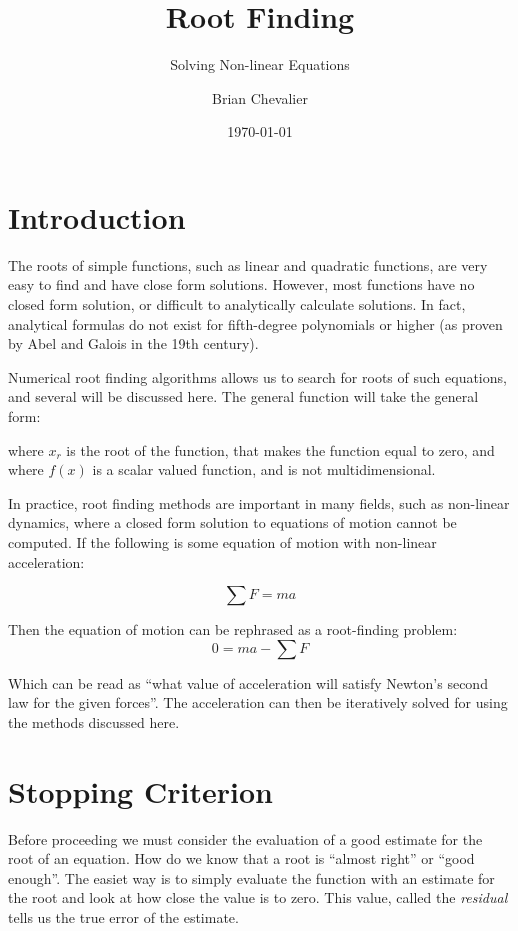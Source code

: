\documentclass{../../KDHnotes}
\title{Root Finding}
\subtitle{Solving Non-linear Equations}
\author{Brian Chevalier}
\date{\today}
\begin{document}
\maketitle
\section{Introduction}

The roots of simple functions, such as linear and quadratic functions, are very easy to find and have close form solutions. However, most functions have no closed form solution, or difficult to analytically calculate solutions. In fact, analytical formulas do not exist for fifth-degree polynomials or higher (as proven by Abel and Galois in the 19th century).

Numerical root finding algorithms allows us to search for roots of such equations, and several will be discussed here. The general function will take the general form:


where $x_r$ is the root of the function, that makes the function equal to zero, and where $f(x)$ is a scalar valued function, and is not multidimensional.

In practice, root finding methods are important in many fields, such as non-linear dynamics, where a closed form solution to equations of motion cannot be computed. If the following is some equation of motion with non-linear acceleration:

\begin{equation}
  \sum F = ma
\end{equation}

Then the equation of motion can be rephrased as a root-finding problem:
\begin{equation}
  0 = ma - \sum F
\end{equation}

Which can be read as ``what value of acceleration will satisfy Newton's second law for the given forces''. The acceleration can then be iteratively solved for using the methods discussed here.

\section{Stopping Criterion}
Before proceeding we must consider the evaluation of a good estimate for the root of an equation. How do we know that a root is ``almost right'' or ``good enough''. The easiet way is to simply evaluate the function with an estimate for the root and look at how close the value is to zero. This value, called the \textit{residual} tells us the true error of the estimate.
\end{document}
